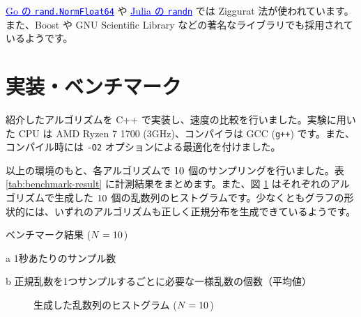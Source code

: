 \documentclass[twocolumn, dvipdfmx]{jsarticle}
\begin{document}
\href{https://github.com/golang/go/blob/be9379f8a8e2bfd924966020d177552d01833fdb/src/math/rand/normal.go}{\textcolor{blue}{\underline{Go の \texttt{rand.NormFloat64}}}} や \href{https://github.com/JuliaLang/julia/blob/ab05173c9539efb0aa82319f13672260a7b88076/stdlib/Random/src/normal.jl}{\textcolor{blue}{\underline{Julia の \texttt{randn}}}} では Ziggurat 法が使われています。また、Boost や GNU Scientific Library などの著名なライブラリでも採用されているようです。

\section*{実装・ベンチマーク}

紹介したアルゴリズムを C++ で実装し、速度の比較を行いました。実験に用いた CPU は AMD Ryzen 7 1700 (3GHz)、コンパイラは GCC (\texttt{g++}) です。また、コンパイル時には \texttt{-O2} オプションによる最適化を付けました。

以上の環境のもと、各アルゴリズムで $10^{\protect}$ 個のサンプリングを行いました。表 \ref{tab:benchmark-result} に計測結果をまとめます。また、図 \ref{fig:histogram} はそれぞれのアルゴリズムで生成した $10^{\protect}$ 個の乱数列のヒストグラムです。少なくともグラフの形状的には、いずれのアルゴリズムも正しく正規分布を生成できているようです。

\begin{table}
    \caption{ベンチマーク結果 ($N = 10^{\protect}$)}
    \label{tab:benchmark-result}
    \begin{threeparttable}
        \centering
        
        \begin{tablenotes}
            \item[a] 1秒あたりのサンプル数
            \item[b] 正規乱数を1つサンプルするごとに必要な一様乱数の個数（平均値）
        \end{tablenotes}
    \end{threeparttable}
\end{table}

\begin{figure}[t]
    \centering
    \begin{subfigmatrix}{3}
    \end{subfigmatrix}
    \caption{生成した乱数列のヒストグラム ($N = 10^{\protect}$)}
    \label{fig:histogram}
\end{figure}
\end{document}
